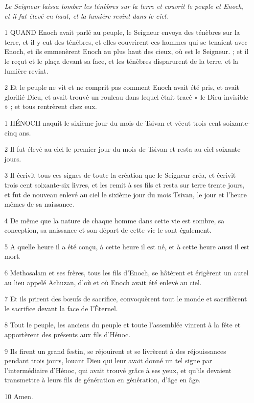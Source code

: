 
\par \textit{Le Seigneur laissa tomber les ténèbres sur la terre et couvrit le peuple et Enoch, et il fut élevé en haut, et la lumière revint dans le ciel.}

\par 1 QUAND Enoch avait parlé au peuple, le Seigneur envoya des ténèbres sur la terre, et il y eut des ténèbres, et elles couvrirent ces hommes qui se tenaient avec Enoch, et ils emmenèrent Enoch au plus haut des cieux, où est le Seigneur. ; et il le reçut et le plaça devant sa face, et les ténèbres disparurent de la terre, et la lumière revint.

\par 2 Et le peuple ne vit et ne comprit pas comment Enoch avait été pris, et avait glorifié Dieu, et avait trouvé un rouleau dans lequel était tracé « le Dieu invisible » ; et tous rentrèrent chez eux.


\par 1 HÉNOCH naquit le sixième jour du mois de Tsivan et vécut trois cent soixante-cinq ans.

\par 2 Il fut élevé au ciel le premier jour du mois de Tsivan et resta au ciel soixante jours.

\par 3 Il écrivit tous ces signes de toute la création que le Seigneur créa, et écrivit trois cent soixante-six livres, et les remit à ses fils et resta sur terre trente jours, et fut de nouveau enlevé au ciel le sixième jour du mois Tsivan, le jour et l'heure mêmes de sa naissance.

\par 4 De même que la nature de chaque homme dans cette vie est sombre, sa conception, sa naissance et son départ de cette vie le sont également.

\par 5 A quelle heure il a été conçu, à cette heure il est né, et à cette heure aussi il est mort.

\par 6 Methosalam et ses frères, tous les fils d'Enoch, se hâtèrent et érigèrent un autel au lieu appelé Achuzan, d'où et où Enoch avait été enlevé au ciel.

\par 7 Et ils prirent des bœufs de sacrifice, convoquèrent tout le monde et sacrifièrent le sacrifice devant la face de l'Éternel.

\par 8 Tout le peuple, les anciens du peuple et toute l'assemblée vinrent à la fête et apportèrent des présents aux fils d'Hénoc.

\par 9 Ils firent un grand festin, se réjouirent et se livrèrent à des réjouissances pendant trois jours, louant Dieu qui leur avait donné un tel signe par l'intermédiaire d'Hénoc, qui avait trouvé grâce à ses yeux, et qu'ils devaient transmettre à leurs fils de génération en génération, d'âge en âge.

\par 10 Amen.



